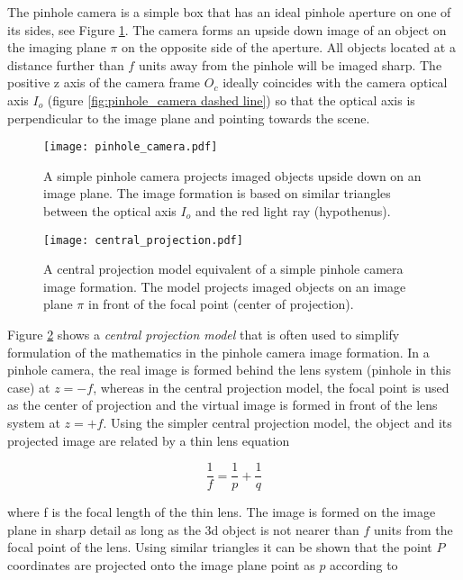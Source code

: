 \documentclass[12pt,a4paper,oneside,pdftex]{report}
\begin{document}
The pinhole camera is a simple box that has an ideal pinhole aperture on one of its sides, see Figure \ref{fig:pinhole_camera}. The camera forms an upside down image of an object on the imaging plane $\pi$ on the opposite side of the aperture. All objects located at a distance further than $f$ units away from the pinhole will be imaged sharp. The positive z axis of the camera frame $O_c$ ideally coincides with the camera optical axis $I_o$ (figure \ref{fig:pinhole_camera dashed line}) so that the optical axis is perpendicular to the image plane and pointing towards the scene. 

\begin{figure}[ht]
  \begin{center}
    \texttt{[image: pinhole\_camera.pdf]}
    \caption{A simple pinhole camera projects imaged objects upside down on an image plane. The image formation is based on similar triangles between the optical axis $I_o$ and the red light ray (hypothenus).}
    \label{fig:pinhole_camera}
  \end{center}
\end{figure}

\begin{figure}[ht]
  \begin{center}
    \texttt{[image: central\_projection.pdf]}
    \caption{A central projection model equivalent of a simple pinhole camera image formation. The model projects imaged objects on an image plane $\pi$ in front of the focal point (center of projection).}
    \label{fig:central_projection}
  \end{center}
\end{figure}

Figure \ref{fig:central_projection} shows a \emph{central projection model} that is often used to simplify formulation of the mathematics in the pinhole camera image formation. In a pinhole camera, the real image is formed behind the lens system (pinhole in this case) at $z = -f$, whereas in the central projection model, the focal point is used as the center of projection and the virtual image is formed in front of the lens system at $z = +f$. Using the simpler central projection model, the object and its projected image are related by a thin lens equation

\begin{equation}
\frac{1}{f} = \frac{1}{p} + \frac{1}{q}
\label{eq:lens_law}
\end{equation}

where f is the focal length of the thin lens. The image is formed on the image plane in sharp detail as long as the 3d object is not nearer than $f$ units from the focal point of the lens. Using similar triangles it can be shown that the point $P$ coordinates are projected onto the image plane point as $p$ according to
\end{document}
